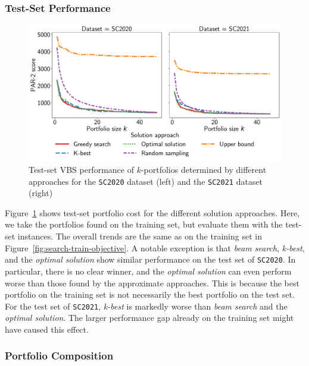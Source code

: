 \documentclass[runningheads]{llncs}
\begin{document}
\subsubsection{Test-Set Performance}

\begin{figure}[htb]
	\centering
	\includegraphics[width=\columnwidth]{plots/search-test-objective.pdf}
	\caption{Test-set VBS performance of $k$-portfolios determined by different approaches for the \texttt{SC2020} dataset (left) and the \texttt{SC2021} dataset (right)}
	\label{fig:search-test-objective}
\end{figure}

Figure~\ref{fig:search-test-objective} shows test-set portfolio cost for the different solution approaches.
Here, we take the portfolios found on the training set, but evaluate them with the test-set instances.
The overall trends are the same as on the training set in Figure~\ref{fig:search-train-objective}.
A notable exception is that \emph{beam search}, \emph{k-best}, and the \emph{optimal solution} show similar performance on the test set of \texttt{SC2020}.
In particular, there is no clear winner, and the \emph{optimal solution} can even perform worse than those found by the approximate approaches. 
This is because the best portfolio on the training set is not necessarily the best portfolio on the test set.
For the test set of \texttt{SC2021}, \emph{k-best} is markedly worse than \emph{beam search} and the \emph{optimal solution}. 
The larger performance gap already on the training set might have caused this effect.

\subsubsection{Portfolio Composition}
\end{document}
